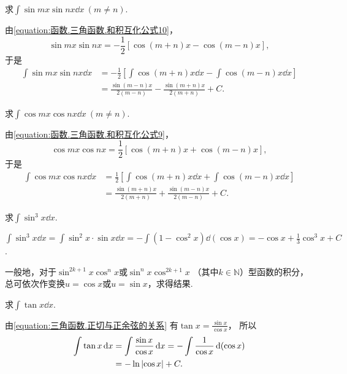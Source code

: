 \begin{example}
求\(\int \sin mx \sin nx \dd{x}\ (m \neq n)\).
\begin{solution}
由\cref{equation:函数.三角函数.和积互化公式10}，
\begin{equation*}
	\sin mx \sin nx
	= -\frac12 [\cos(m+n)x - \cos(m-n)x],
\end{equation*}
于是\begin{align}
	\int \sin mx \sin nx \dd{x}
	&= -\frac12 \left[
		\int \cos(m+n)x \dd{x}
		- \int \cos(m-n)x \dd{x}
	\right]
	\nonumber \\
	&= \frac{\sin(m-n)x}{2(m-n)}
		- \frac{\sin(m+n)x}{2(m+n)}
		+ C.
\end{align}
\end{solution}
\end{example}

\begin{example}
求\(\int \cos mx \cos nx \dd{x}\ (m \neq n)\).
\begin{solution}
由\cref{equation:函数.三角函数.和积互化公式9}，
\begin{equation*}
	\cos mx \cos nx
	= \frac12 [\cos(m+n)x + \cos(m-n)x],
\end{equation*}
于是\begin{align}
	\int \cos mx \cos nx \dd{x}
	&= \frac12 \left[
		\int \cos(m+n)x \dd{x}
		+ \int \cos(m-n)x \dd{x}
	\right]
	\nonumber \\
	&= \frac{\sin(m+n)x}{2(m+n)}
		+ \frac{\sin(m-n)x}{2(m-n)}
		+ C.
\end{align}
\end{solution}
\end{example}

\begin{example}
求\(\int \sin^3 x \dd{x}\).
\begin{solution}
\(\int \sin^3 x \dd{x}
= \int \sin^2 x \cdot \sin x \dd{x}
= -\int (1 - \cos^2 x) \dd(\cos x)
= -\cos x + \frac{1}{3} \cos^3 x + C\).
\end{solution}
\end{example}

\begin{remark}
一般地，对于\(\sin^{2k+1} x \cos^n x\)或\(\sin^n x \cos^{2k+1} x\)
（其中\(k\in\mathbb{N}\)）型函数的积分，
总可依次作变换\(u = \cos x\)或\(u = \sin x\)，求得结果.
\end{remark}

\begin{example}
求\(\int \tan x \dd{x}\).
\begin{solution}
由\cref{equation:三角函数.正切与正余弦的关系}
有\(\tan x = \frac{\sin x}{\cos x}\)，
所以\begin{align*}
	\int \tan x \dd{x}
	&= \int \frac{\sin x}{\cos x} \dd{x}
	= - \int \frac{1}{\cos x} \dd(\cos x) \\
	&= - \ln\abs{\cos x} + C.
\end{align*}
\end{solution}
\end{example}

